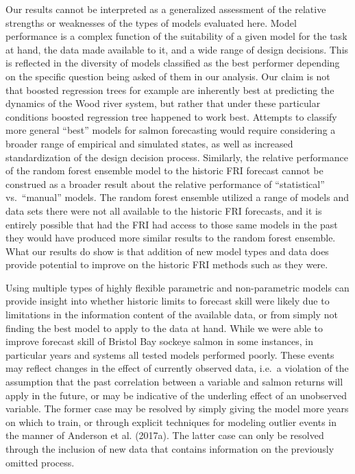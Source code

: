 \documentclass[
]{article}
\begin{document}
Our results cannot be interpreted as a generalized assessment of the relative strengths or weaknesses of the types of models evaluated here. Model performance is a complex function of the suitability of a given model for the task at hand, the data made available to it, and a wide range of design decisions. This is reflected in the diversity of models classified as the best performer depending on the specific question being asked of them in our analysis. Our claim is not that boosted regression trees for example are inherently best at predicting the dynamics of the Wood river system, but rather that under these particular conditions boosted regression tree happened to work best. Attempts to classify more general ``best'' models for salmon forecasting would require considering a broader range of empirical and simulated states, as well as increased standardization of the design decision process. Similarly, the relative performance of the random forest ensemble model to the historic FRI forecast cannot be construed as a broader result about the relative performance of ``statistical'' vs.~``manual'' models. The random forest ensemble utilized a range of models and data sets there were not all available to the historic FRI forecasts, and it is entirely possible that had the FRI had access to those same models in the past they would have produced more similar results to the random forest ensemble. What our results do show is that addition of new model types and data does provide potential to improve on the historic FRI methods such as they were.

Using multiple types of highly flexible parametric and non-parametric models can provide insight into whether historic limits to forecast skill were likely due to limitations in the information content of the available data, or from simply not finding the best model to apply to the data at hand. While we were able to improve forecast skill of Bristol Bay sockeye salmon in some instances, in particular years and systems all tested models performed poorly. These events may reflect changes in the effect of currently observed data, i.e.~a violation of the assumption that the past correlation between a variable and salmon returns will apply in the future, or may be indicative of the underling effect of an unobserved variable. The former case may be resolved by simply giving the model more years on which to train, or through explicit techniques for modeling outlier events in the manner of Anderson et al. (2017a). The latter case can only be resolved through the inclusion of new data that contains information on the previously omitted process.
\end{document}

